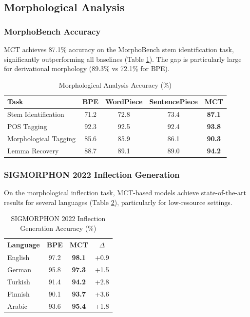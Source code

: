 \documentclass[conference]{IEEEtran}
\begin{document}
\subsection{Morphological Analysis}

\subsubsection{MorphoBench Accuracy}
MCT achieves 87.1\% accuracy on the MorphoBench stem identification task, significantly outperforming all baselines (Table \ref{tab:morphobench}). The gap is particularly large for derivational morphology (89.3\% vs 72.1\% for BPE).

\begin{table}[h]
\centering
\caption{Morphological Analysis Accuracy (\%)}
\label{tab:morphobench}
\begin{tabular}{lcccc}
\toprule
\textbf{Task} & \textbf{BPE} & \textbf{WordPiece} & \textbf{SentencePiece} & \textbf{MCT} \\
\midrule
Stem Identification & 71.2 & 72.8 & 73.4 & \textbf{87.1} \\
POS Tagging & 92.3 & 92.5 & 92.4 & \textbf{93.8} \\
Morphological Tagging & 85.6 & 85.9 & 86.1 & \textbf{90.3} \\
Lemma Recovery & 88.7 & 89.1 & 89.0 & \textbf{94.2} \\
\bottomrule
\end{tabular}
\end{table}

\subsubsection{SIGMORPHON 2022 Inflection Generation}
On the morphological inflection task, MCT-based models achieve state-of-the-art results for several languages (Table \ref{tab:sigmorphon}), particularly for low-resource settings.

\begin{table}[h]
\centering
\caption{SIGMORPHON 2022 Inflection Generation Accuracy (\%)}
\label{tab:sigmorphon}
\begin{tabular}{lccc}
\toprule
\textbf{Language} & \textbf{BPE} & \textbf{MCT} & $\Delta$ \\
\midrule
English & 97.2 & \textbf{98.1} & +0.9 \\
German & 95.8 & \textbf{97.3} & +1.5 \\
Turkish & 91.4 & \textbf{94.2} & +2.8 \\
Finnish & 90.1 & \textbf{93.7} & +3.6 \\
Arabic & 93.6 & \textbf{95.4} & +1.8 \\
\bottomrule
\end{tabular}
\end{table}
\end{document}
